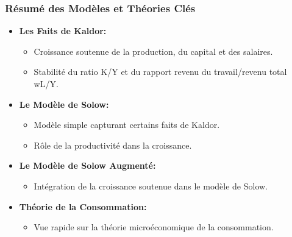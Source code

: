 \documentclass{beamer}
\begin{document}
\begin{frame}
    \frametitle{Résumé des Modèles et Théories Clés}

    \begin{itemize}
        \item \textbf{Les Faits de Kaldor:}
        \begin{itemize}
            \item Croissance soutenue de la production, du capital et des salaires.
            \item Stabilité du ratio K/Y et du rapport revenu du travail/revenu total wL/Y.
        \end{itemize}
        \pause
        \item \textbf{Le Modèle de Solow:}
        \begin{itemize}
            \item Modèle simple capturant certains faits de Kaldor.
            \item Rôle de la productivité dans la croissance.
        \end{itemize}
        \pause
        \item \textbf{Le Modèle de Solow Augmenté:}
        \begin{itemize}
            \item Intégration de la croissance soutenue dans le modèle de Solow.
        \end{itemize}
        \pause
        \item \textbf{Théorie de la Consommation:}
        \begin{itemize}
            \item Vue rapide sur la théorie microéconomique de la consommation.
        \end{itemize}
    \end{itemize}
\end{frame}


%

\end{document}
